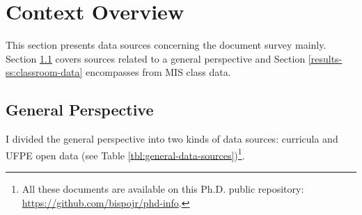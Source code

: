 \section{Context Overview}
\label{res-sec:context-overview}

This section presents data sources concerning the document survey mainly. Section \ref{results-ss:general-overview} covers sources related to a general perspective and Section \ref{results-ss:classroom-data} encompasses from \gls{MIS} class data.

\subsection{General Perspective}
\label{results-ss:general-overview}

I divided the general perspective into two kinds of data sources: curricula and \gls{UFPE} open data (see Table \ref{tbl:general-data-sources})\footnote{All these documents are available on this \gls{Ph.D.} public repository: \url{https://github.com/bispojr/phd-info}.}.

